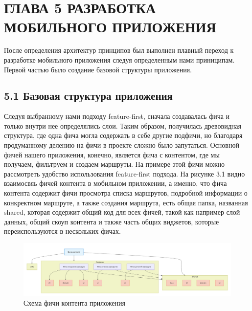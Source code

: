 \section{ГЛАВА 5 РАЗРАБОТКА МОБИЛЬНОГО ПРИЛОЖЕНИЯ}

После определения архитектур принципов был выполнен плавный переход к разработке мобильного приложения следуя определенным нами приниципам. 
Первой частью было создание базовой структуры приложения.

\subsection*{5.1 Базовая структура приложения}
Следуя выбранному нами подходу feature-first, сначала создавалась фича и только внутри нее определялись слои. Таким образом, получилась древовидная структура, где одна фича могла содержать в себе другие подфичи, но благодаря продуманному делению на фичи в проекте сложно было запутаться. Основной фичей нашего приложения, конечно, является фича с контентом, где мы получаем, фильтруем и создаем маршруты. На примере этой фичи можно рассмотреть удобство использования feature-first подхода. На рисунке 3.1 видно взаимосвяь фичей контента в мобильном приложении, а именно, что фича контента содержит фичи просмотра списка маршрутов, подробной информации о конкректном маршруте, а также создания маршрута, есть общая папка, названная shared, которая содержит общий код для всех фичей, такой как например слой данных, общий скоуп контента и также часть общих виджетов, которые переиспользуются в нескольких фичах.

\begin{landscape}
\begin{figure}[htb!]
\begin{center}
\includegraphics[height=0.4\textwidth]{Images/mobile_logic/структура_фичи.png}
\end{center}
\caption{Схема фичи контента приложения}
\label{fig:db_scheme}
\end{figure}
\end{landscape}

